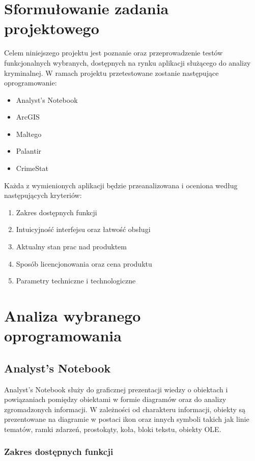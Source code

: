 \documentclass[11pt,a4paper]{article}
\begin{document}


\tableofcontents
\newpage

\section{Sformułowanie zadania projektowego}

Celem niniejszego projektu jest poznanie oraz przeprowadzenie testów funkcjonalnych wybranych, dostępnych na rynku  aplikacji służącego do analizy kryminalnej. W ramach projektu przetestowane zostanie następujące oprogramowanie:
\begin{itemize}
	\item Analyst’s Notebook
	\item ArcGIS
	\item Maltego
	\item Palantir
	\item CrimeStat
\end{itemize}
Każda z wymienionych aplikacji będzie przeanalizowana i oceniona według następujących kryteriów:
\begin{enumerate}
	\item Zakres dostępnych funkcji
	\item Intuicyjność interfejsu oraz łatwość obsługi
	\item Aktualny stan prac nad produktem
	\item Sposób licencjonowania oraz cena produktu
	\item Parametry techniczne i technologiczne
\end{enumerate}

\section{Analiza wybranego oprogramowania} 

\subsection{Analyst's Notebook}

Analyst’s Notebook służy do graficznej prezentacji wiedzy o obiektach i powiązaniach pomiędzy obiektami w formie diagramów oraz do analizy zgromadzonych informacji. W zależności od charakteru informacji, obiekty są prezentowane na diagramie w postaci ikon oraz innych symboli takich jak linie tematów, ramki zdarzeń, prostokąty, koła, bloki tekstu, obiekty OLE.

\subsubsection*{Zakres dostępnych funkcji}
\end{document}
